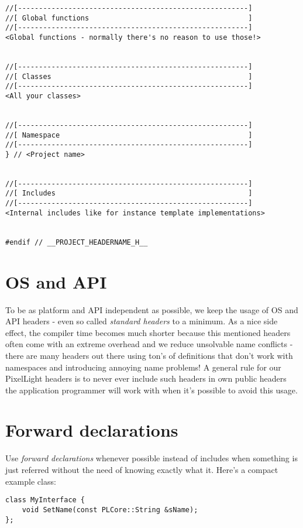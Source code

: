 \begin{lstlisting}[caption=Complete header layout]
//[-------------------------------------------------------]
//[ Global functions                                      ]
//[-------------------------------------------------------]
<Global functions - normally there's no reason to use those!>


//[-------------------------------------------------------]
//[ Classes                                               ]
//[-------------------------------------------------------]
<All your classes>


//[-------------------------------------------------------]
//[ Namespace                                             ]
//[-------------------------------------------------------]
} // <Project name>


//[-------------------------------------------------------]
//[ Includes                                              ]
//[-------------------------------------------------------]
<Internal includes like for instance template implementations>


#endif // __PROJECT_HEADERNAME_H__
\end{lstlisting}




\section{OS and API}
To be as platform and API independent as possible, we keep the usage of OS and API headers - even so called \emph{standard headers} to a minimum. As a nice side effect, the compiler time becomes much shorter because this mentioned headers often come with an extreme overhead and we reduce unsolvable name conflicts - there are many headers out there using ton's of definitions that don't work with namespaces and introducing annoying name problems! A general rule for our PixelLight headers is to never ever include such headers in own public headers the application programmer will work with when it's possible to avoid this usage.




\section{Forward declarations}
Use \emph{forward declarations} whenever possible instead of includes when something is just referred without the need of knowing exactly what it. Here's a compact example class:

\begin{lstlisting}[caption=Using forward declaration]
class MyInterface {
    void SetName(const PLCore::String &sName);
};
\end{lstlisting}

